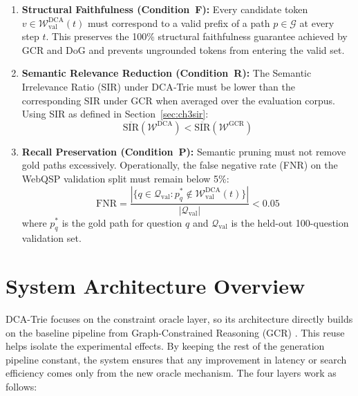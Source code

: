 \begin{enumerate}
  \item \textbf{Structural Faithfulness (Condition~F):} Every candidate token $v \in \mathcal{W}_{\text{val}}^{\text{DCA}}(t)$ must correspond to a valid prefix of a path $p \in \mathcal{G}$ at every step $t$. This preserves the 100\% structural faithfulness guarantee achieved by GCR and DoG and prevents ungrounded tokens from entering the valid set.

  \item \textbf{Semantic Relevance Reduction (Condition~R):} The Semantic Irrelevance Ratio (SIR) under DCA‑Trie must be lower than the corresponding SIR under GCR when averaged over the evaluation corpus. Using SIR as defined in Section~\ref{sec:ch3sir}:
        \begin{equation}
          \overline{\text{SIR}}\!\left(\mathcal{W}^{\text{DCA}}\right) <
          \overline{\text{SIR}}\!\left(\mathcal{W}^{\text{GCR}}\right)
          \label{eq:sir_condition}
        \end{equation}

  \item \textbf{Recall Preservation (Condition~P):} Semantic pruning must not remove gold paths excessively. Operationally, the false negative rate (FNR) on the WebQSP validation split must remain below 5\%:
        \begin{equation}
          \text{FNR} = \frac{|\{q \in \mathcal{Q}_{\text{val}} :
          p^*_q \notin \mathcal{W}_{\text{val}}^{\text{DCA}}(t)\}|}{|\mathcal{Q}_{\text{val}}|}
          < 0.05
          \label{eq:fnr}
        \end{equation}
        where $p^*_q$ is the gold path for question $q$ and $\mathcal{Q}_{\text{val}}$ is the held-out 100-question validation set.
\end{enumerate}


\section{System Architecture Overview}
\label{sec:ch3arch}

DCA-Trie focuses on the constraint oracle layer, so its architecture directly builds on the baseline pipeline from Graph-Constrained Reasoning (GCR) \citep{luo2025-graph-constrained-reasoning}. This reuse helps isolate the experimental effects. By keeping the rest of the generation pipeline constant, the system ensures that any improvement in latency or search efficiency comes only from the new oracle mechanism. The four layers work as follows:

